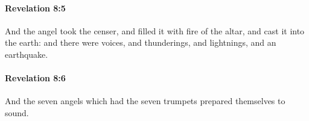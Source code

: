 		\paragraph{Revelation 8:5} %
			\label{REVELATIONNT-8-5}

			And the angel took the censer, and filled it with fire of the altar, and cast it into the earth: and there were voices, and thunderings, and lightnings, and an earthquake.

			\begin{framed}
			\scriptsize
				\begin{compactdesc}
					\item[SBLG] 
				\end{compactdesc}
			\end{framed}

		\paragraph{Revelation 8:6} %
			\label{REVELATIONNT-8-6}

			And the seven angels which had the seven trumpets prepared themselves to sound.

